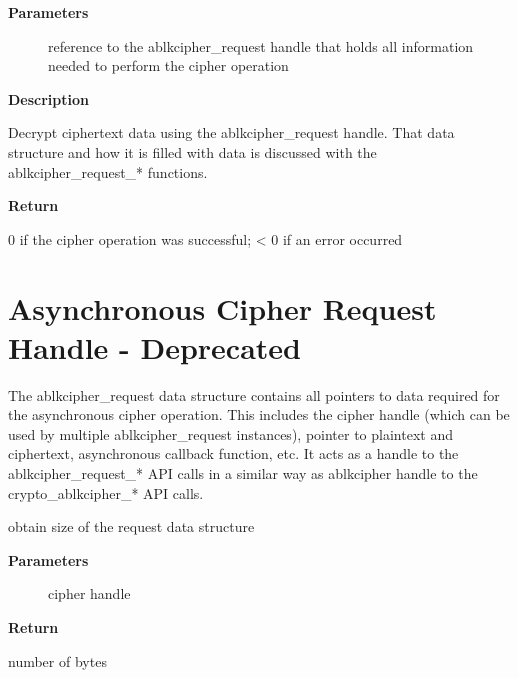 \documentclass[a4paper,8pt,english]{sphinxmanual}
\begin{document}
\textbf{Parameters}
\begin{description}
\item[{}] \leavevmode
reference to the ablkcipher\_request handle that holds all information
needed to perform the cipher operation

\end{description}

\textbf{Description}

Decrypt ciphertext data using the ablkcipher\_request handle. That data
structure and how it is filled with data is discussed with the
ablkcipher\_request\_* functions.

\textbf{Return}

0 if the cipher operation was successful; \textless{} 0 if an error occurred


\section{Asynchronous Cipher Request Handle - Deprecated}
\label{crypto/api-skcipher:asynchronous-cipher-request-handle-deprecated}
The ablkcipher\_request data structure contains all pointers to data
required for the asynchronous cipher operation. This includes the cipher
handle (which can be used by multiple ablkcipher\_request instances), pointer
to plaintext and ciphertext, asynchronous callback function, etc. It acts
as a handle to the ablkcipher\_request\_* API calls in a similar way as
ablkcipher handle to the crypto\_ablkcipher\_* API calls.

\begin{fulllineitems}
\label{crypto/api-skcipher:c.crypto_ablkcipher_reqsize}
obtain size of the request data structure

\end{fulllineitems}


\textbf{Parameters}
\begin{description}
\item[{}] \leavevmode
cipher handle

\end{description}

\textbf{Return}

number of bytes
\end{document}
